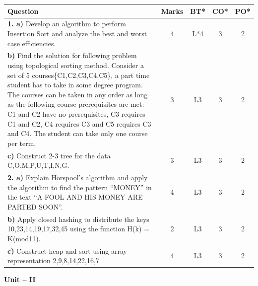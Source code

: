 \documentclass[10pt,a4paper]{article}
\begin{document}
\noindent
\begin{tabular}{|p{10.5cm}|c|c|c|c|}
\hline
\textbf{Question} & \textbf{Marks} & \textbf{BT*} & \textbf{CO*} & \textbf{PO*} \\
\hline
\textbf{1. a)} Develop an algorithm to perform Insertion Sort and analyze the best and worst case efficiencies. & 4 & L*4 & 3 & 2 \\
\hline
\textbf{b)} Find the solution for following problem using topological sorting method. Consider a set of 5 courses\{C1,C2,C3,C4,C5\}, a part time student has to take in some degree program. The courses can be taken in any order as long as the following course prerequisites are met: C1 and C2 have no prerequisites, C3 requires C1 and C2, C4 requires C3 and C5 requires C3 and C4. The student can take only one course per term. & 3 & L3 & 3 & 2 \\
\hline
\textbf{c)} Construct 2-3 tree for the data C,O,M,P,U,T,I,N,G. & 3 & L3 & 3 & 2 \\
\hline
\textbf{2. a)} Explain Horspool's algorithm and apply the algorithm to find the pattern ``MONEY'' in the text ``A FOOL AND HIS MONEY ARE PARTED SOON''. & 4 & L3 & 3 & 2 \\
\hline
\textbf{b)} Apply closed hashing to distribute the keys 10,23,14,19,17,32,45 using the function H(k) = K(mod11). & 2 & L3 & 3 & 2 \\
\hline
\textbf{c)} Construct heap and sort using array representation 2,9,8,14,22,16,7 & 4 & L3 & 3 & 2 \\
\hline
\end{tabular}

\vspace{0.3cm}

\begin{center}
{\large \textbf{Unit -- II}}
\end{center}
\end{document}
